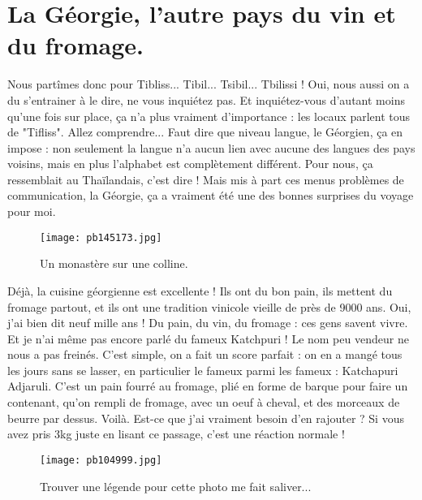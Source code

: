 \documentclass{book}
\begin{document}
\chapter{La Géorgie, l'autre pays du vin et du fromage.}
Nous partîmes donc pour Tibliss... Tibil... Tsibil... Tbilissi ! Oui, nous aussi on a du s'entrainer à le dire, ne vous inquiétez pas. Et inquiétez-vous d'autant moins qu'une fois sur place, ça n'a plus vraiment d'importance : les locaux parlent tous de "Tifliss". Allez comprendre... Faut dire que niveau langue, le Géorgien, ça en impose : non seulement la langue n'a aucun lien avec aucune des langues des pays voisins, mais en plus l'alphabet est complètement différent. Pour nous, ça ressemblait au Thaïlandais, c'est dire ! Mais mis à part ces menus problèmes de communication, la Géorgie, ça a vraiment été une des bonnes surprises du voyage pour moi.


\begin{figure}[h]
\centering
\texttt{[image: pb145173.jpg]}
\caption*{Un monastère sur une colline.}
\end{figure}

Déjà, la cuisine géorgienne est excellente ! Ils ont du bon pain, ils mettent du fromage partout, et ils ont une tradition vinicole vieille de près de 9000 ans. Oui, j'ai bien dit neuf mille ans ! Du pain, du vin, du fromage : ces gens savent vivre. Et je n'ai même pas encore parlé du fameux Katchpuri ! Le nom peu vendeur ne nous a pas freinés. C'est simple, on a fait un score parfait : on en a mangé tous les jours sans se lasser, en particulier le fameux parmi les fameux : Katchapuri Adjaruli. C'est un pain fourré au fromage, plié en forme de barque pour faire un contenant, qu'on rempli de fromage, avec un oeuf à cheval, et des morceaux de beurre par dessus. Voilà. Est-ce que j'ai vraiment besoin d'en rajouter ? Si vous avez pris 3kg juste en lisant ce passage, c'est une réaction normale !


\begin{figure}[h]
\centering
\texttt{[image: pb104999.jpg]}
\caption*{Trouver une légende pour cette photo me fait saliver...}
\end{figure}
\end{document}
